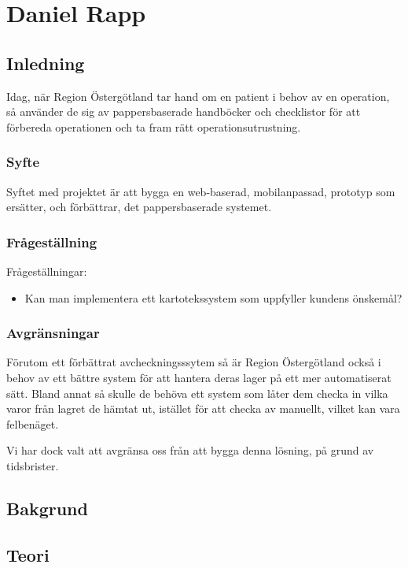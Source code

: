 \section{Daniel Rapp}
\subsection{Inledning}
Idag, när Region Östergötland tar hand om en patient i behov av en operation, så använder de sig av pappersbaserade handböcker och checklistor för att
förbereda operationen och ta fram rätt operationsutrustning.

\subsubsection{Syfte}
Syftet med projektet är att bygga en web-baserad, mobilanpassad, prototyp som ersätter, och förbättrar, det pappersbaserade systemet.


\subsubsection{Frågeställning}
Frågeställningar:
\begin{itemize}
  \item Kan man implementera ett kartotekssystem som uppfyller kundens önskemål?
\end{itemize}


\subsubsection{Avgränsningar}
Förutom ett förbättrat avcheckningsssytem så är Region Östergötland också i behov av
ett bättre system för att hantera deras lager på ett mer automatiserat sätt. %
Bland annat
så skulle de behöva ett system som låter dem checka in vilka varor från lagret de hämtat
ut, istället för att checka av manuellt, vilket kan vara felbenäget.

Vi har dock valt att avgränsa oss från att bygga denna lösning, på grund av tidsbrister.


\subsection{Bakgrund}


\subsection{Teori}

